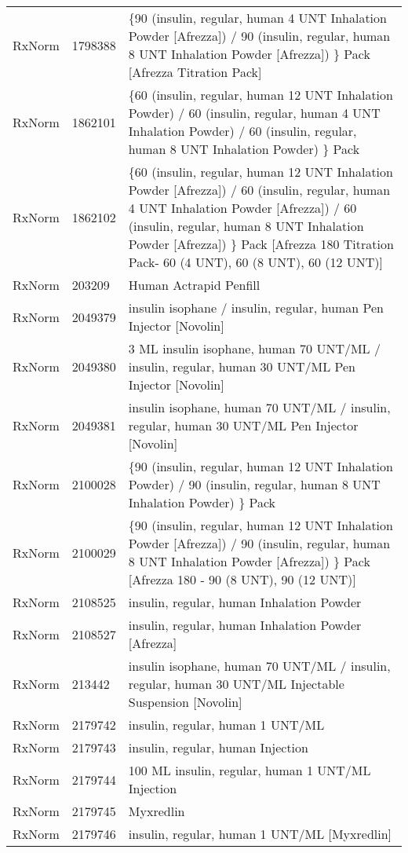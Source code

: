 \begin{longtable}{p{}p{}p{}}
  RxNorm & 1798388 & \{90 (insulin, regular, human 4 UNT Inhalation Powder [Afrezza]) / 90 (insulin, regular, human 8 UNT Inhalation Powder [Afrezza]) \} Pack [Afrezza Titration Pack] \\ 
  RxNorm & 1862101 & \{60 (insulin, regular, human 12 UNT Inhalation Powder) / 60 (insulin, regular, human 4 UNT Inhalation Powder) / 60 (insulin, regular, human 8 UNT Inhalation Powder) \} Pack \\ 
  RxNorm & 1862102 & \{60 (insulin, regular, human 12 UNT Inhalation Powder [Afrezza]) / 60 (insulin, regular, human 4 UNT Inhalation Powder [Afrezza]) / 60 (insulin, regular, human 8 UNT Inhalation Powder [Afrezza]) \} Pack [Afrezza 180 Titration Pack- 60 (4 UNT), 60 (8 UNT), 60 (12 UNT)] \\ 
  RxNorm & 203209 & Human Actrapid Penfill \\ 
  RxNorm & 2049379 & insulin isophane / insulin, regular, human Pen Injector [Novolin] \\ 
  RxNorm & 2049380 & 3 ML insulin isophane, human 70 UNT/ML / insulin, regular, human 30 UNT/ML Pen Injector [Novolin] \\ 
  RxNorm & 2049381 & insulin isophane, human 70 UNT/ML / insulin, regular, human 30 UNT/ML Pen Injector [Novolin] \\ 
  RxNorm & 2100028 & \{90 (insulin, regular, human 12 UNT Inhalation Powder) / 90 (insulin, regular, human 8 UNT Inhalation Powder) \} Pack \\ 
  RxNorm & 2100029 & \{90 (insulin, regular, human 12 UNT Inhalation Powder [Afrezza]) / 90 (insulin, regular, human 8 UNT Inhalation Powder [Afrezza]) \} Pack [Afrezza 180 - 90 (8 UNT), 90 (12 UNT)] \\ 
  RxNorm & 2108525 & insulin, regular, human Inhalation Powder \\ 
  RxNorm & 2108527 & insulin, regular, human Inhalation Powder [Afrezza] \\ 
  RxNorm & 213442 & insulin isophane, human 70 UNT/ML / insulin, regular, human 30 UNT/ML Injectable Suspension [Novolin] \\ 
  RxNorm & 2179742 & insulin, regular, human 1 UNT/ML \\ 
  RxNorm & 2179743 & insulin, regular, human Injection \\ 
  RxNorm & 2179744 & 100 ML insulin, regular, human 1 UNT/ML Injection \\ 
  RxNorm & 2179745 & Myxredlin \\ 
  RxNorm & 2179746 & insulin, regular, human 1 UNT/ML [Myxredlin] \\ 

\end{longtable}
